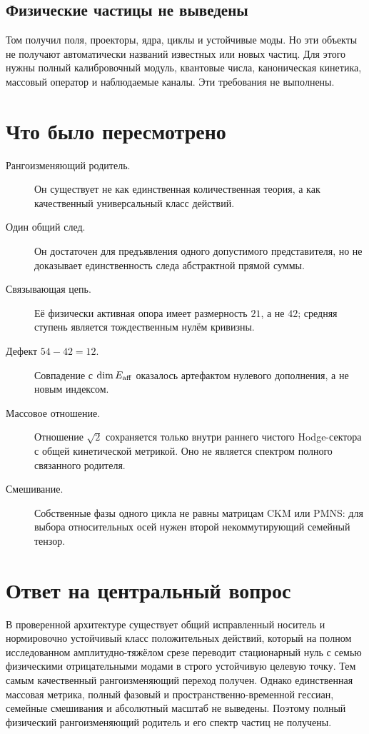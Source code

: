 \subsection{Физические частицы не выведены}

Том получил поля, проекторы, ядра, циклы и устойчивые моды. Но эти объекты
не получают автоматически названий известных или новых частиц. Для этого
нужны полный калибровочный модуль, квантовые числа, каноническая кинетика,
массовый оператор и наблюдаемые каналы. Эти требования не выполнены.

\section{Что было пересмотрено}

\begin{description}
 \item[Рангоизменяющий родитель.] Он существует не как единственная
 количественная теория, а как качественный универсальный класс действий.

 \item[Один общий след.] Он достаточен для предъявления одного допустимого
 представителя, но не доказывает единственность следа абстрактной прямой
 суммы.

 \item[Связывающая цепь.] Её физически активная опора имеет размерность
 $21$, а не $42$; средняя ступень является тождественным нулём кривизны.

 \item[Дефект $54-42=12$.] Совпадение с $\dim E_{\rm aff}$ оказалось
 артефактом нулевого дополнения, а не новым индексом.

 \item[Массовое отношение.] Отношение $\sqrt2$ сохраняется только внутри
 раннего чистого Hodge-сектора с общей кинетической метрикой. Оно не
 является спектром полного связанного родителя.

 \item[Смешивание.] Собственные фазы одного цикла не равны матрицам CKM или
 PMNS: для выбора относительных осей нужен второй некоммутирующий семейный
 тензор.
\end{description}

\section{Ответ на центральный вопрос}

\begin{theorem}
В проверенной архитектуре существует общий исправленный носитель и
нормировочно устойчивый класс положительных действий, который на полном
исследованном амплитудно-тяжёлом срезе переводит стационарный нуль с семью
физическими отрицательными модами в строго устойчивую целевую точку. Тем
самым качественный рангоизменяющий переход получен. Однако единственная
массовая метрика, полный фазовый и пространственно-временной гессиан,
семейные смешивания и абсолютный масштаб не выведены. Поэтому полный
физический рангоизменяющий родитель и его спектр частиц не получены.
\end{theorem}

